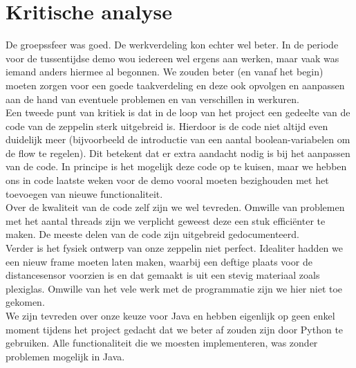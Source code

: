 \documentclass[eind]{penoverslag}
\begin{document}
\section{Kritische analyse}
De groepssfeer was goed. De werkverdeling kon echter wel beter. In de periode voor de tussentijdse demo wou iedereen wel ergens aan werken, maar vaak was iemand anders hiermee al begonnen. We zouden beter (en vanaf het begin) moeten zorgen voor een goede taakverdeling en deze ook opvolgen en aanpassen aan de hand van eventuele problemen en van verschillen in werkuren. \\
Een tweede punt van kritiek is dat in de loop van het project een gedeelte van de code van de zeppelin sterk uitgebreid is. Hierdoor is de code niet altijd even duidelijk meer (bijvoorbeeld de introductie van een aantal boolean-variabelen om de flow te regelen). Dit betekent dat er extra aandacht nodig is bij het aanpassen van de code. In principe is het mogelijk deze code op te kuisen, maar we hebben ons in code laatste weken voor de demo vooral moeten bezighouden met het toevoegen van nieuwe functionaliteit. \\
Over de kwaliteit van de code zelf zijn we wel tevreden. Omwille van problemen met het aantal threads zijn we verplicht geweest deze een stuk effici\"enter te maken. De meeste delen van de code zijn uitgebreid gedocumenteerd. \\
Verder is het fysiek ontwerp van onze zeppelin niet perfect. Idealiter hadden we een nieuw frame moeten laten maken, waarbij een deftige plaats voor de distancesensor voorzien is en dat gemaakt is uit een stevig materiaal zoals plexiglas. Omwille van het vele werk met de programmatie zijn we hier niet toe gekomen. \\
We zijn tevreden over onze keuze voor Java en hebben eigenlijk op geen enkel moment tijdens het project gedacht dat we beter af zouden zijn door Python te gebruiken. Alle functionaliteit die we moesten implementeren, was zonder problemen mogelijk in Java. \\
\end{document}

